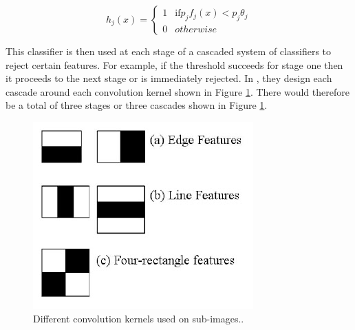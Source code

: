 \documentclass[
	submission,
	final,
	notitlepage,
	narroweqnarray,
	inline,
	twoside,
	]{ieee}
\begin{document}
\begin{equation}
   h_j(x) = \begin{cases}
     1  & \text{if} p_jf_j(x) < p_j \theta_j \\
     0 & otherwise
        \end{cases}
\end{equation}

This classifier is then used at each stage of a cascaded system of classifiers
to reject certain features. For example, if the threshold succeeds for stage one
then it proceeds to the next stage or is immediately rejected. In \cite{haar_cascades}, 
they design each cascade around each convolution kernel shown in Figure 
\ref{fig:haar_cascades}. There would therefore be a total of three stages
or three cascades shown in Figure \ref{fig:haar_cascades}.

\begin{figure}[h]
\centering
\includegraphics[width=\linewidth]{figures/haar_features}
\caption{Different convolution kernels used on sub-images..}
\label{fig:haar_cascades} 
\end{figure}
\end{document}
